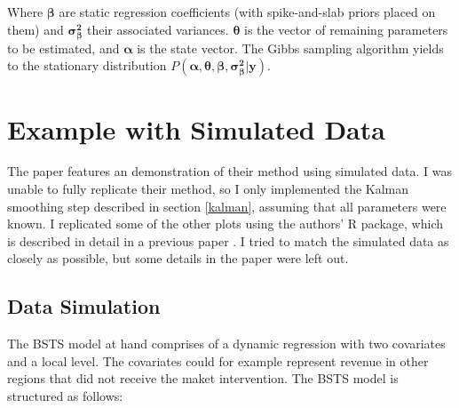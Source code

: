 \documentclass[12pt]{article}
\begin{document}
Where $\boldsymbol{\beta}$ are static regression coefficients (with spike-and-slab priors placed on them) and $\boldsymbol{\sigma^2_\beta}$ their associated variances. $\boldsymbol{\theta}$ is the vector of remaining parameters to be estimated, and $\boldsymbol{\alpha}$ is the state vector. The Gibbs sampling algorithm yields to the stationary distribution $P(\boldsymbol{\alpha}, \boldsymbol{\theta}, \boldsymbol{\beta},  \boldsymbol{\sigma^2_{\beta}}|\boldsymbol{y})$.

\section{Example with Simulated Data}\label{toy}
The paper features an demonstration of their method using simulated data. I was unable to fully replicate their method, so I only implemented the Kalman smoothing step described in section \ref{kalman}, assuming that all parameters were known. I replicated some of the other plots using the authors' R package, which is described in detail in a previous paper \cite{scott2014predicting}. I tried to match the simulated data as closely as possible, but some details in the paper were left out.

\subsection{Data Simulation}
The BSTS model at hand comprises of a dynamic regression with two covariates and a local level. The covariates could for example represent revenue in other regions that did not receive the maket intervention. The BSTS model is structured as follows:
\end{document}
